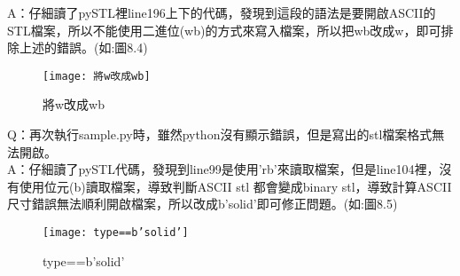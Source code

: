 A：仔細讀了pySTL裡line196上下的代碼，發現到這段的語法是要開啟ASCII的STL檔案，所以不能使用二進位(wb)的方式來寫入檔案，所以把wb改成w，即可排除上述的錯誤。(如:圖8.4)\\
\begin{figure}[hbt!]
\begin{center}
\texttt{[image: 將w改成wb]}
\caption{\Large 將w改成wb}
\label{將w改成wb}
\end{center}
\end{figure}


Q：再次執行sample.py時，雖然python沒有顯示錯誤，但是寫出的stl檔案格式無法開啟。\\

A：仔細讀了pySTL代碼，發現到line99是使用’rb’來讀取檔案，但是line104裡，沒有使用位元(b)讀取檔案，導致判斷ASCII stl 都會變成binary stl，導致計算ASCII尺寸錯誤無法順利開啟檔案，所以改成b’solid’即可修正問題。(如:圖8.5)\\
\begin{figure}[hbt!]
\begin{center}
\texttt{[image: type==b'solid']}
\caption{\Large type==b'solid'}
\label{type==b'solid'}
\end{center}
\end{figure}
